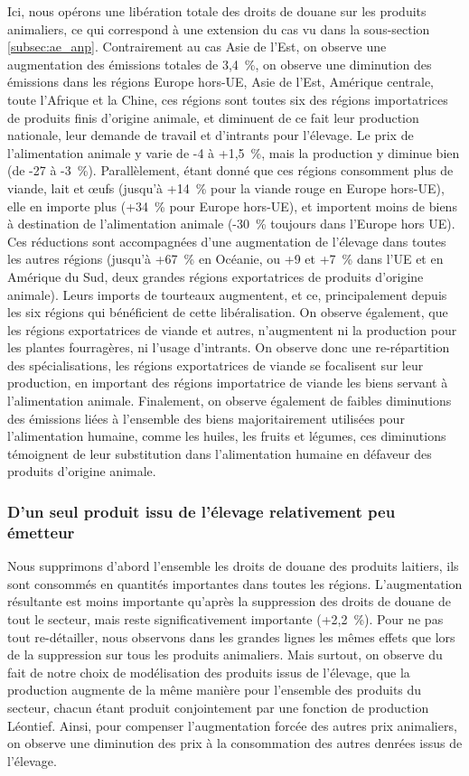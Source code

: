 Ici, nous opérons une libération totale des droits de douane sur les produits animaliers, ce qui correspond à une extension du cas vu dans la sous-section \ref{subsec:ae_anp}. Contrairement au cas Asie de l'Est, on observe une augmentation des émissions totales de 3,4~\%, on observe une diminution des émissions dans les régions Europe hors-UE, Asie de l'Est, Amérique centrale, toute l'Afrique et la Chine, ces régions sont toutes six des régions importatrices de produits finis d'origine animale, et diminuent de ce fait leur production nationale, leur demande de travail et d'intrants pour l'élevage. Le prix de l'alimentation animale y varie de -4 à +1,5~\%, mais la production y diminue bien (de -27 à -3~\%). Parallèlement, étant donné que ces régions consomment plus de viande, lait et œufs (jusqu'à +14~\% pour la viande rouge en Europe hors-UE), elle en importe plus (+34~\% pour Europe hors-UE), et importent moins de biens à destination de l'alimentation animale (-30~\% toujours dans l'Europe hors UE). Ces réductions sont accompagnées d'une augmentation de l'élevage dans toutes les autres régions (jusqu'à +67~\% en Océanie, ou +9 et +7~\% dans l'UE et en Amérique du Sud, deux grandes régions exportatrices de produits d'origine animale). Leurs imports de tourteaux augmentent, et ce, principalement depuis les six régions qui bénéficient de cette libéralisation. On observe également, que les régions exportatrices de viande et autres, n'augmentent ni la production pour les plantes fourragères, ni l'usage d'intrants. On observe donc une re-répartition des spécialisations, les régions exportatrices de viande se focalisent sur leur production, en important des régions importatrice de viande les biens servant à l'alimentation animale. Finalement, on observe également de faibles diminutions des émissions liées à l'ensemble des biens majoritairement utilisées pour l'alimentation humaine, comme les huiles, les fruits et légumes, ces diminutions témoignent de leur substitution dans l'alimentation humaine en défaveur des produits d'origine animale.

\subsubsection{D'un seul produit issu de l'élevage relativement peu émetteur}

Nous supprimons d'abord l'ensemble les droits de douane des produits laitiers, ils sont consommés en quantités importantes dans toutes les régions. L'augmentation résultante est moins importante qu'après la suppression des droits de douane de tout le secteur, mais reste significativement importante (+2,2~\%). Pour ne pas tout re-détailler, nous observons dans les grandes lignes les mêmes effets que lors de la suppression sur tous les produits animaliers. Mais surtout, on observe du fait de notre choix de modélisation des produits issus de l'élevage, que la production augmente de la même manière pour l'ensemble des produits du secteur, chacun étant produit conjointement par une fonction de production Léontief. Ainsi, pour compenser l'augmentation forcée des autres prix animaliers, on observe une diminution des prix à la consommation des autres denrées issus de l'élevage.


